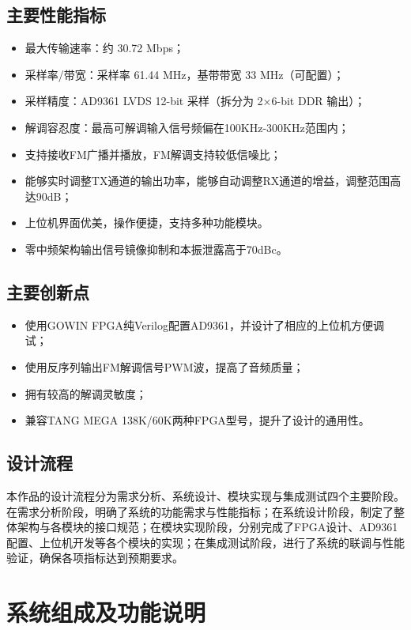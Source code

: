 \documentclass[10pt, a4paper]{article}
\begin{document}
\subsection{主要性能指标}

\begin{itemize}[leftmargin=*]
    \item 最大传输速率：约 30.72 Mbps；
    \item 采样率/带宽：采样率 61.44 MHz，基带带宽 33 MHz（可配置）；
    \item 采样精度：AD9361 LVDS 12-bit 采样（拆分为 2×6-bit DDR 输出）；
    \item 解调容忍度：最高可解调输入信号频偏在100KHz-300KHz范围内；
    \item 支持接收FM广播并播放，FM解调支持较低信噪比；
    \item 能够实时调整TX通道的输出功率，能够自动调整RX通道的增益，调整范围高达90dB；
    \item 上位机界面优美，操作便捷，支持多种功能模块。
    \item 零中频架构输出信号镜像抑制和本振泄露高于70dBc。
\end{itemize}

\subsection{主要创新点}
\begin{itemize}[leftmargin=*]
    \item 使用GOWIN FPGA纯Verilog配置AD9361，并设计了相应的上位机方便调试；
    \item 使用反序列输出FM解调信号PWM波，提高了音频质量；
    \item 拥有较高的解调灵敏度；
    \item 兼容TANG MEGA 138K/60K两种FPGA型号，提升了设计的通用性。
\end{itemize}

\subsection{设计流程}
本作品的设计流程分为需求分析、系统设计、模块实现与集成测试四个主要阶段。在需求分析阶段，明确了系统的功能需求与性能指标；在系统设计阶段，制定了整体架构与各模块的接口规范；在模块实现阶段，分别完成了FPGA设计、AD9361配置、上位机开发等各个模块的实现；在集成测试阶段，进行了系统的联调与性能验证，确保各项指标达到预期要求。
\section{系统组成及功能说明}
\end{document}
